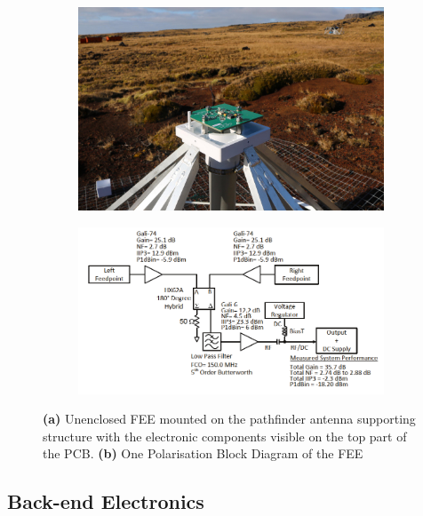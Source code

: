 \begin{figure}
	\centering
	\begin{subfigure}[t]{0.52\textwidth}
		\centering
		\includegraphics[width=\linewidth]{Figures/balun} 
		\caption{} \label{Fig:balun}
	\end{subfigure}
	\hfill
	\begin{subfigure}[t]{0.47\textwidth}
		\centering
		\includegraphics[width=\linewidth]{Figures/Balun_Block.png}
		\caption{} \label{Fig:Balun Schematic}
	\end{subfigure}
	\caption{{\bf (a)} Unenclosed FEE mounted on the pathfinder antenna supporting structure with the electronic components visible on the top part of the PCB. {\bf (b)} One Polarisation Block Diagram of the FEE \cite{2012PASP..124.1090H}} \label{Fig:fee}
\end{figure}

\subsection{Back-end Electronics}

